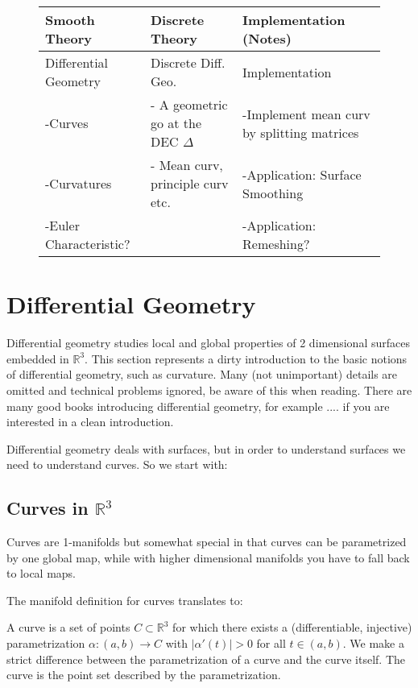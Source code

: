 \begin{figure}[ht]
\begin{longtable}{|p{4.5cm}|p{4.5cm}|p{4.5cm}|}
\hline
Smooth Theory& Discrete Theory& Implementation (Notes)\\
\hline
Differential Geometry & Discrete Diff. Geo. & Implementation\\
-Curves & - A geometric go at the DEC $\Delta$ & -Implement mean curv by splitting matrices\\
-Curvatures & - Mean curv, principle curv etc.& -Application: Surface Smoothing\\
-Euler Characteristic? & & -Application: Remeshing? \\			
\hline
\end{longtable}
\end{figure}

\section{Differential Geometry}
Differential geometry studies local and global properties of 2 dimensional surfaces embedded in $\mathbb R^3$. This section represents a dirty introduction to the basic notions of differential geometry, such as curvature. Many (not unimportant) details are omitted and technical problems ignored, be aware of this when reading. There are many good books introducing differential geometry, for example .... if you are interested in a clean introduction.

Differential geometry deals with surfaces, but in order to understand surfaces we need to understand curves. So we start with:

\subsection{Curves in $\mathbb R^3$}
Curves are 1-manifolds but somewhat special in that curves can be parametrized by one global map, while with higher dimensional manifolds you have to fall back to local maps. 

The manifold definition for curves translates to: 

\begin{definition}[Curve] A curve is a set of points $C \subset \mathbb R^3$ for which there exists a (differentiable, injective) parametrization $\alpha : (a,b) \to C$ with $\left|\alpha'(t)\right| >0$ for all $t\in (a,b)$. We make a strict difference between the parametrization of a curve and the curve itself. The curve is the point set described by the parametrization.
\end{definition}

